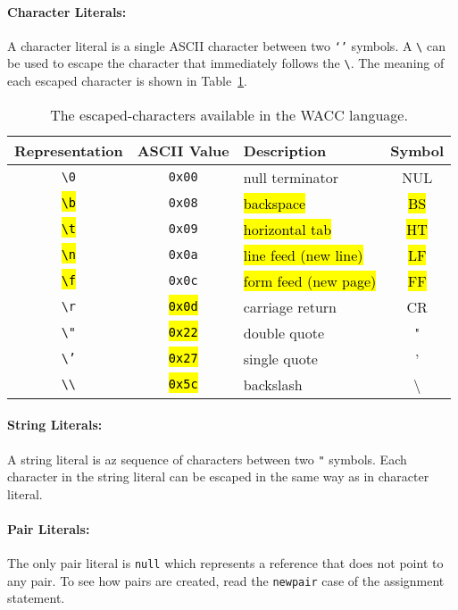 \documentclass[a4paper]{article}
\theoremstyle{definition}
\newtheorem{question}{Gap}
\newcommand{\fillgap}[2]{
  \begin{center}
  \fbox{
    \begin{minipage}{4in}
      \begin{question}
        {\it #1} \hfill ({\bf #2})
      \end{question}
    \end{minipage}
  }
\end{center}
}
\begin{document}
\paragraph{Character Literals:}
A character literal  is a single ASCII character between two \texttt{\char`'} symbols.
A \texttt{\textbackslash} can be used to escape the character that immediately follows the \texttt{\textbackslash}.
The meaning of each escaped character is shown in Table~\ref{tab:escapedcharacters}.
\fillgap{\hl{Fill in Table}~\ref{tab:escapedcharacters}}{2 marks}
%
\begin{table}
  \centering
  \begin{tabular}{cclc}
    \hline
    Representation & ASCII Value & Description & Symbol \\
    \hline
    \texttt{\textbackslash 0} & \texttt{0x00} & null terminator & NUL \\
    \hl{\texttt{\textbackslash b}} & \texttt{0x08} & \hl{backspace} & \hl{BS} \\
    \hl{\texttt{\textbackslash t}} & \texttt{0x09} & \hl{horizontal tab} & \hl{HT} \\
    \hl{\texttt{\textbackslash n}} & \texttt{0x0a} & \hl{line feed (new line)} & \hl{LF} \\
    \hl{\texttt{\textbackslash f}} & \texttt{0x0c} & \hl{form feed (new page)} & \hl{FF} \\
    \texttt{\textbackslash r} & \hl{\texttt{0x0d}} & carriage return & CR \\
    \texttt{\textbackslash "} & \hl{\texttt{0x22}} & double quote & " \\
    \texttt{\textbackslash '} & \hl{\texttt{0x27}} & single quote & ' \\
    \texttt{\textbackslash \textbackslash} & \hl{\texttt{0x5c}} & backslash & \textbackslash \\
    \hline
  \end{tabular}
  \caption{The escaped-characters available in the WACC language.}
  \label{tab:escapedcharacters}
\end{table}
%

\paragraph{String Literals:}
A string literal  is az sequence of characters between two \texttt{"} symbols.
Each character in the string literal can be escaped in the same way as in character literal.

\paragraph{Pair Literals:}
The only pair literal  is \texttt{null} which represents a reference that does not point to any pair.
To see how pairs are created, read the \texttt{newpair} case of the assignment statement.
\end{document}
